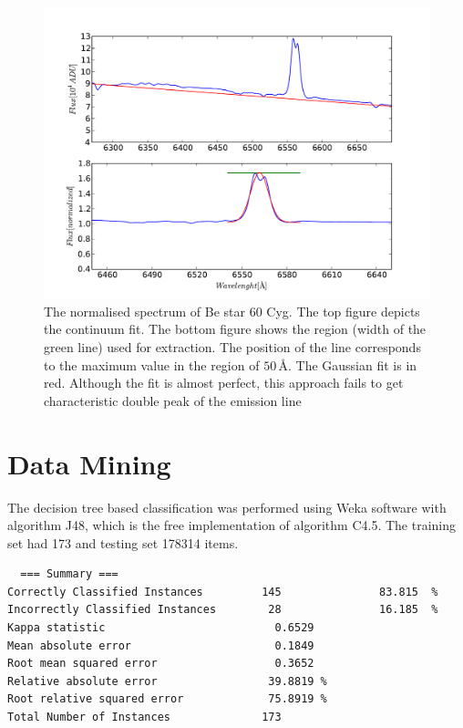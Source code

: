 \documentclass[11pt,twoside]{article}
\begin{document}
\begin{center}
\begin{figure}[!htbp]
  \begin{center}
    \leavevmode
    \includegraphics[scale = .6]{figSpecCharCyg60}
    \caption{The normalised spectrum of Be star 60 Cyg. The top figure
      depicts the continuum fit. The bottom figure shows the region
      (width of the green line) used for extraction. The position of
      the line corresponds to the maximum value in the region of
      $50\,\textrm{\AA}$. The Gaussian fit is in red. Although the fit
      is almost perfect, this approach fails to get characteristic
      double peak of the emission line}
    \label{FigConvolution}
  \end{center}
\end{figure}

\end{center}



\section{Data Mining}
The decision tree based classification was performed using Weka software with algorithm
J48, which is the free implementation of algorithm C4.5. The training set had
173 and testing set 178314 items.



\begin{lstlisting}
  === Summary ===
Correctly Classified Instances         145               83.815  %
Incorrectly Classified Instances        28               16.185  %
Kappa statistic                          0.6529
Mean absolute error                      0.1849
Root mean squared error                  0.3652
Relative absolute error                 39.8819 %
Root relative squared error             75.8919 %
Total Number of Instances              173     
\end{lstlisting}
\end{document}
